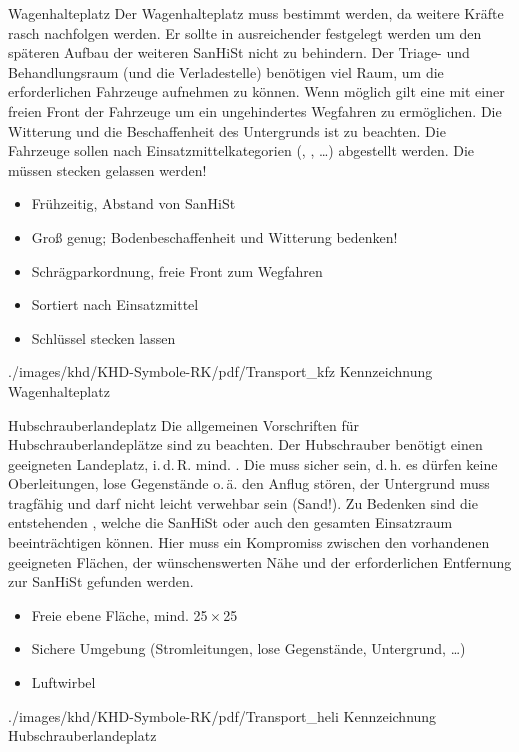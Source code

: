 \TextSlideTeaser
{Wagenhalte\-platz}%
{%
Der Wagenhalteplatz muss  bestimmt werden, da
weitere Kräfte rasch nachfolgen werden. Er sollte in
ausreichender  festgelegt werden um den
späteren Aufbau der weiteren SanHiSt nicht zu behindern.
Der Triage- und Behandlungsraum (und die
Verladestelle) benötigen viel Raum, um die erforderlichen
Fahrzeuge aufnehmen zu können. Wenn möglich gilt eine
 mit einer freien Front der Fahrzeuge um ein 
ungehindertes Wegfahren zu ermöglichen.
Die Witterung und die Beschaffenheit des Untergrunds ist zu
beachten.
Die Fahrzeuge sollen nach Einsatzmittelkategorien
(, , \ldots)  abgestellt werden.
Die  müssen stecken gelassen werden!}%
{
\begin{itemize}
    \item Frühzeitig, Abstand von SanHiSt
    \item Groß genug; Bodenbeschaffenheit und Witterung bedenken!
    \item Schrägparkordnung, freie Front zum Wegfahren
    \item Sortiert nach Einsatzmittel
    \item Schlüssel stecken lassen
\end{itemize}}%
{./images/khd/KHD-Symbole-RK/pdf/Transport_kfz}%
{Kennzeichnung Wagenhalte\-platz}%
{}%
{}%
{}%



\TextSlideTeaser
{Hubschrauberlandeplatz}%
{%
Die allgemeinen Vorschriften für
Hubschrauberlandeplätze sind zu beachten.
Der Hubschrauber benötigt einen
geeigneten Landeplatz, i.\,d.\,R. mind.
. 
%
Die  muss sicher sein, 
d.\,h. es dürfen keine
Oberleitungen, lose Gegenstände o.\,ä. den 
Anflug stören, 
der Untergrund muss tragfähig 
und darf nicht leicht verwehbar sein (Sand!).
%
Zu Bedenken sind die entstehenden , welche die SanHiSt
oder auch den gesamten Einsatzraum beeinträchtigen
können.
Hier muss ein Kompromiss zwischen den vorhandenen
geeigneten Flächen, der wünschenswerten Nähe und der
erforderlichen Entfernung zur SanHiSt gefunden werden.}%
{
\begin{itemize}
    \item Freie ebene Fläche, mind.
    {25\,$\times$\,25\Meter*}
    \item Sichere Umgebung (Stromleitungen, lose Gegenstände, Untergrund, \ldots)
    \item Luftwirbel
\end{itemize}}%
{./images/khd/KHD-Symbole-RK/pdf/Transport_heli}%
{Kennzeichnung Hubschrauberlandeplatz}%
{}%
{}%
{}%

